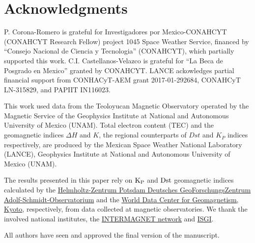 \documentclass[a4paper,fleqn]{cas-dc}
\begin{document}
\section*{Acknowledgments}
P. Corona-Romero is grateful for Investigadores por Mexico-CONAHCYT (CONAHCYT Research Fellow) project 1045 Space Weather Service, financed by “Consejo Nacional de Ciencia y Tecnologia” (CONAHCYT), which partially supported this work. C.I. Castellanos-Velazco is grateful for “La Beca de Posgrado en Mexico” granted by CONAHCYT. LANCE ackowledges partial financial support from CONHACyT-AEM grant 2017-01-292684, CONAHCyT LN-315829, and PAPIIT IN116023.

This work used data from the Teoloyucan Magnetic Observatory operated by the Magnetic Service of the Geophysics Institute at National and Autonomous University of Mexico (UNAM). Total electron content (TEC) and the geomagnetic indices $\Delta H$ and $K$, the regional counterparts of $Dst$ and $K_P$ indices respectively, are produced by the Mexican Space Weather National Laboratory (LANCE), Geophysics Institute at National and Autonomous University of Mexico (UNAM).

The results presented in this paper rely on ${\rm K_{P}}$ and ${\rm Dst}$ geomagnetic indices calculated by the \href{https://www.gfz-potsdam.de/en/kp-index}{Helmholtz-Zentrum Potsdam Deutsches GeoForschungsZentrum Adolf-Schmidt-Observatorium} and the \href{https://wdc.kugi.kyoto-u.ac.jp/}{World Data Center for Geomagnetism, Kyoto}, respectively, from data collected at magnetic observatories. We thank the involved national institutes, the \href{https://intermagnet.github.io/}{INTERMAGNET network} and \href{https://isgi.unistra.fr}{ISGI}.

All authors have seen and approved the final version of the manuscript.  


\label{Ack}
%




\bio{}
\endbio
\end{document}
